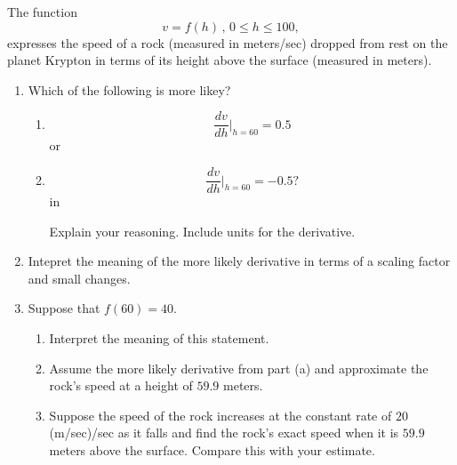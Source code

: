 \documentclass{ximera}
\newcommand{\pskip}{\vskip 0.1 in}
\begin{document}
\begin{example} \label{Ex8df8334df}
The function
\[
   v= f(h) \, , \, 0\leq h \leq 100 ,
\]
expresses the speed of a rock (measured in meters/sec) dropped from rest on the planet Krypton in terms of its height above the surface (measured in meters).

\begin{enumerate}
\item Which of the following is more likey?

\begin{enumerate}
\item 
\[
  \frac{dv}{dh}\Big|_{h=60} = 0.5
\]
or 
\item 
\[
  \frac{dv}{dh}\Big|_{h=60} = -0.5 ?
\]
\pskip

Explain your reasoning. Include units for the derivative.

\end{enumerate}

\item Intepret the meaning of the more likely derivative in terms of a scaling factor and small changes.

\item Suppose that $f(60) = 40$.

\begin{enumerate}
\item Interpret the meaning of this statement.

\item Assume the more likely derivative from part (a) and approximate the rock's speed at a height of $59.9$ meters.

\item Suppose the speed of the rock increases at the constant rate of $20$ (m/sec)/sec as it falls and find the rock's exact speed when it is $59.9$ meters above the surface. Compare this with your estimate.
\end{enumerate}

\end{enumerate}
\end{example}
\end{document}
